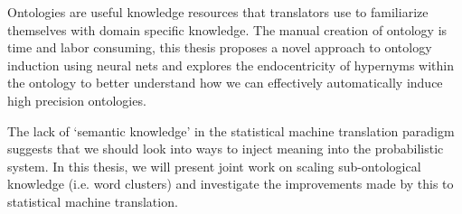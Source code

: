 Ontologies are useful knowledge resources that translators use to familiarize themselves with domain specific knowledge. The manual creation of ontology is time and labor consuming, this thesis proposes a novel approach to ontology induction using neural nets and explores the endocentricity of hypernyms within the ontology to better understand how we can effectively automatically induce high precision ontologies.

The lack of `semantic knowledge' in the statistical machine translation paradigm suggests that we should look into ways to inject meaning into the probabilistic system. In this thesis, we will present joint work on scaling sub-ontological knowledge (i.e. word clusters) and investigate the improvements made by this to statistical machine translation.






